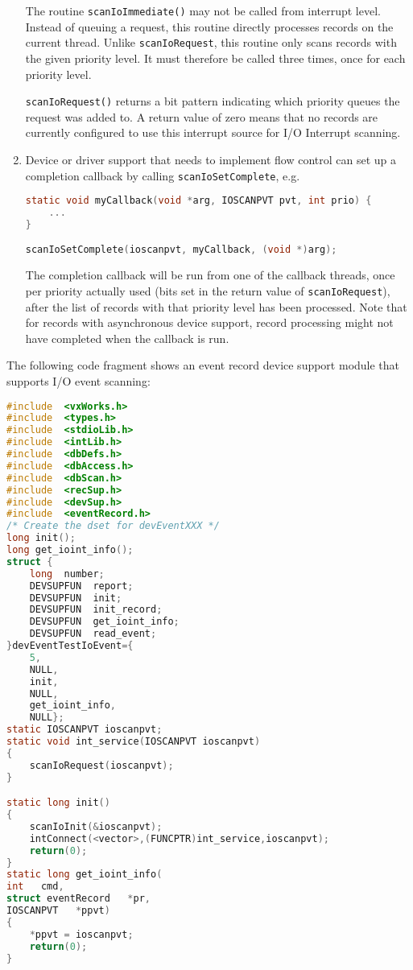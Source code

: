 \begin{enumerate}
The routine \verb|scanIoImmediate()| may not be called from interrupt level.
Instead of queuing a request, this routine directly processes records on the current thread.
Unlike \verb|scanIoRequest|, this routine only scans records with the given priority level.
It must therefore be called three times, once for each priority level.

\verb|scanIoRequest()| returns a bit pattern indicating which priority queues the request was added to.
A return value of zero means that no records are currently configured to use this interrupt source for I/O Interrupt scanning.

\item Device or driver support that needs to implement flow control can set up a completion callback by calling \verb|scanIoSetComplete|, e.g.

\begin{lstlisting}[language=C]
static void myCallback(void *arg, IOSCANPVT pvt, int prio) {
    ...
}

scanIoSetComplete(ioscanpvt, myCallback, (void *)arg);
\end{lstlisting}

The completion callback will be run from one of the callback threads, once per priority actually used (bits set in the return value of \verb|scanIoRequest|), after the list of records with that priority level has been processed.
Note that for records with asynchronous device support, record processing might not have completed when the callback is run.
\end{enumerate}

The following code fragment shows an event record device support module that supports I/O event scanning: 

\begin{lstlisting}[language=C]
#include  <vxWorks.h>
#include  <types.h>
#include  <stdioLib.h>
#include  <intLib.h>
#include  <dbDefs.h>
#include  <dbAccess.h>
#include  <dbScan.h>
#include  <recSup.h>
#include  <devSup.h>
#include  <eventRecord.h>
/* Create the dset for devEventXXX */
long init();
long get_ioint_info();
struct {
    long  number;
    DEVSUPFUN  report;
    DEVSUPFUN  init;
    DEVSUPFUN  init_record;
    DEVSUPFUN  get_ioint_info;
    DEVSUPFUN  read_event;
}devEventTestIoEvent={
    5,
    NULL,
    init,
    NULL,
    get_ioint_info,
    NULL};
static IOSCANPVT ioscanpvt;
static void int_service(IOSCANPVT ioscanpvt)
{
    scanIoRequest(ioscanpvt);
}

static long init()
{
    scanIoInit(&ioscanpvt);
    intConnect(<vector>,(FUNCPTR)int_service,ioscanpvt);
    return(0);
}
static long get_ioint_info(
int   cmd,
struct eventRecord   *pr,
IOSCANPVT   *ppvt)
{
    *ppvt = ioscanpvt;
    return(0);
}
\end{lstlisting}

